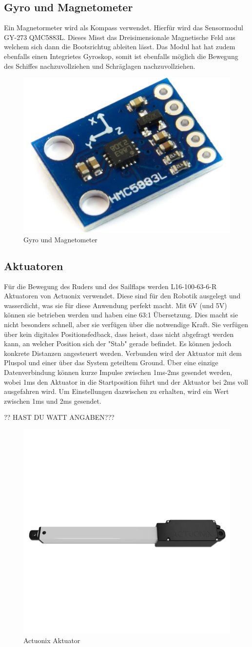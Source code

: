 \subsection{Gyro und Magnetometer}
Ein Magnetormeter wird als Kompass verwendet. Hierfür wird das Sensormodul GY-273 QMC5883L. Dieses Misst das Dreisimensionale Magnetische Feld aus welchem sich dann die Bootsrichtug ableiten lässt. Das Modul hat hat zudem ebenfalls einen Integrietes Gyroskop, somit ist ebenfalls möglich die Bewegung des Schiffes nachzuvollziehen und Schräglagen nachzuvollziehen. 

\begin{figure}[H]
    \centering
    \includegraphics[width=0.25\linewidth]{assets/magnetometer.jpg}
    \caption{Gyro und Magnetometer}

\end{figure}
\subsection{Aktuatoren}
Für die Bewegung des Ruders und des Sailflaps werden L16-100-63-6-R Aktuatoren von Actuonix verwendet. Diese sind für den Robotik ausgelegt und wasserdicht, was sie für diese Anwendung perfekt macht. Mit 6V (und 5V) können sie betrieben werden und haben eine 63:1 Übersetzung. Dies macht sie nicht besonders schnell, aber sie verfügen über die notwendige Kraft.
Sie verfügen über kein digitales Positionsfedback, dass heisst, dass nicht abgefragt werden kann, an welcher Position sich der "Stab" gerade befindet. Es können jedoch konkrete Distanzen angesteuert werden. Verbunden wird der Aktuator mit dem Pluspol und einer über das System geteiltem Ground. Über eine einzige Datenverbindung können kurze Impulse zwischen 1ms-2ms gesendet werden, wobei 1ms den Aktuator in die Startposition führt und der Aktuator bei 2ms voll ausgefahren wird. Um Einstellungen dazwischen zu erhalten, wird ein Wert zwischen 1ms und 2ms gesendet.  


?? HAST DU WATT ANGABEN???
\begin{figure}[H] 
    \centering
    \includegraphics[width=0.5\linewidth]{actuonix.png}
    \caption{Actuonix Aktuator}
    \label{fig:actuator}
\end{figure}


